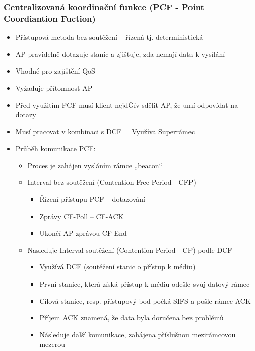 \subsubsection{Centralizovaná koordinační funkce (PCF - Point Coordiantion Fuction) }
\begin{itemize}
    \item Přístupová metoda bez soutěžení – řízená tj. deterministická
    \item AP pravidelně dotazuje stanic a zjišťuje, zda nemají data k vysílání
    \item Vhodné pro zajištění QoS
    \item Vyžaduje přítomnost AP
    \item Před využitím PCF musí klient nejdĜív sdělit AP, že umí odpovídat na dotazy
    \item Musí pracovat v kombinaci s DCF = Využíva Superrámec
    \item Průběh komunikace PCF:
    \begin{itemize}
    \item Proces je zahájen vysláním rámce „beacon“ 
    \item Interval bez soutěžení (Contention-Free Period - CFP)
    \begin{itemize}
    \item Řízení přístupu PCF – dotazování
    \item Zprávy CF-Poll – CF-ACK
    \item Ukončí AP zprávou CF-End
    \end{itemize}
    \item Nasleduje Interval soutěžení (Contention Period - CP) podle DCF 
     \begin{itemize}
     \item Využívá DCF (soutěžení stanic o přístup k médiu)
     \item První stanice, která získá přístup k médiu odešle svůj datový rámec
     \item Cílová stanice, resp. přístupový bod počká SIFS a pošle rámec ACK
     \item Příjem ACK znamená, že data byla doručena bez problémů
     \item Následuje další komunikace, zahájena příslušnou mezirámcovou mezerou
     \end{itemize}
    \end{itemize}
\end{itemize}
